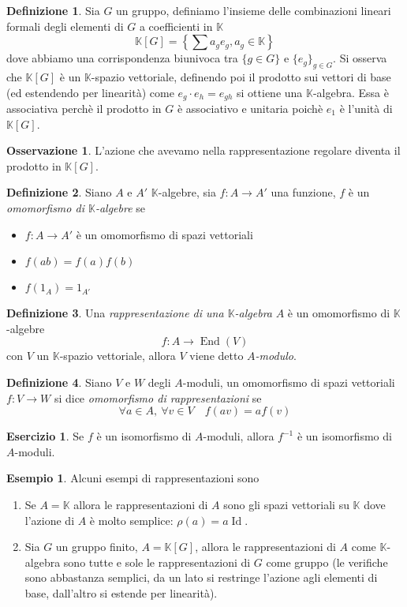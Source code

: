 \documentclass[11pt]{article}
\theoremstyle{plain}
\theoremstyle{definition}
\newtheorem{defn}{Definizione}[section]
\newtheorem{exmp}{Esempio}[section]
\newtheorem{exercise}{Esercizio}[section]
\newtheorem*{rem}{Osservazione}
\theoremstyle{remark}
\newcommand{\K}{\mathbb{K}}
\DeclareMathOperator{\End}{End}
\DeclareMathOperator{\Id}{Id}
\begin{document}
	\begin{defn}
		Sia $G$ un gruppo, definiamo l'insieme delle combinazioni lineari formali degli elementi di $G$ a coefficienti in $\K$
		\[
			\K[G] = \left\{ \sum a_g e_g, a_g\in \K \right\}
		\]
		dove abbiamo una corrispondenza biunivoca tra $\{ g\in G \}$ e $\{ e_g \}_{g\in G}$.
		Si osserva che $\K[G]$ è un $\K$-spazio vettoriale, definendo poi il prodotto sui vettori di base (ed estendendo per linearità) come $e_g\cdot e_h=e_{gh}$ si ottiene una $\K$-algebra. Essa è associativa perchè il prodotto in $G$ è associativo e unitaria poichè $e_1$ è l'unità di $\K[G]$.
	\end{defn}
	\begin{rem}
		L'azione che avevamo nella rappresentazione regolare diventa il prodotto in $\K[G]$.
	\end{rem}
	\begin{defn}
		Siano $A$ e $A'$ $\K$-algebre, sia $f:A\to A'$ una funzione, $f$ è un \textit{omomorfismo di $\K$-algebre} se
		\begin{itemize}
			\item $f:A\to A'$ è un omomorfismo di spazi vettoriali
			\item $f(ab)=f(a)f(b)$
			\item $f(1_A)=1_{A'}$
		\end{itemize}
	\end{defn}
	\begin{defn}
		Una \textit{rappresentazione di una $\K$-algebra} $A$ è un omomorfismo di $\K$-algebre
		\[ f:A\to \End(V)\]
		con $V$ un $\K$-spazio vettoriale, allora $V$ viene detto $A$\textit{-modulo}.
	\end{defn}
	\begin{defn}
		Siano $V$ e $W$ degli $A$-moduli, un omomorfismo di spazi vettoriali $f:V\to W$ si dice \textit{omomorfismo di rappresentazioni} se 
		\[\forall a\in A,\ \forall v\in V \quad f(av)=af(v)\]
	\end{defn}
	\begin{exercise}
		Se $f$ è un isomorfismo di $A$-moduli, allora $f^{-1}$ è un isomorfismo di $A$-moduli. 
	\end{exercise}
	\begin{exmp}
		Alcuni esempi di rappresentazioni sono
		\begin{enumerate}
			\item Se $A=\K$ allora le rappresentazioni di $A$ sono gli spazi vettoriali su $\K$ dove l'azione di $A$ è molto semplice: $\rho(a) = a\Id$.
			\item Sia $G$ un gruppo finito, $A=\K[G]$, allora le rappresentazioni di $A$ come $\K$-algebra sono tutte e sole le rappresentazioni di $G$ come gruppo (le verifiche sono abbastanza semplici, da un lato si restringe l'azione agli elementi di base, dall'altro si estende per linearità).
		\end{enumerate}
	\end{exmp}
\end{document}
